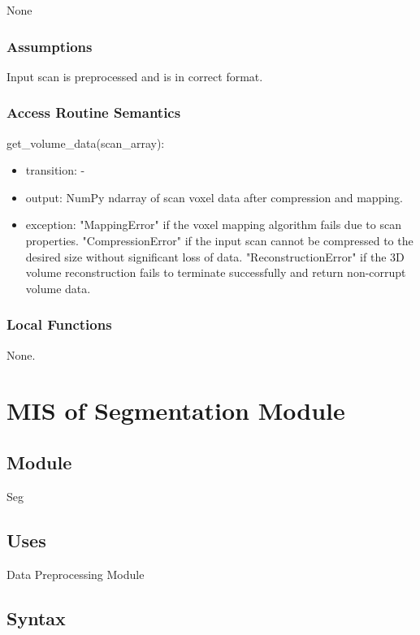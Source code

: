 \documentclass[12pt, titlepage]{article}
\begin{document}
None
\subsubsection{Assumptions}

Input scan is preprocessed and is in correct format.

\subsubsection{Access Routine Semantics}

\noindent get\_volume\_data(scan\_array):
\begin{itemize}
  \item transition: -
  \item output: NumPy ndarray of scan voxel data after compression and mapping.
  \item exception: "MappingError" if the voxel mapping algorithm fails due to scan properties.
        "CompressionError" if the input scan cannot be compressed to the desired size without significant loss of data.
        "ReconstructionError" if the 3D volume reconstruction fails to terminate successfully and return non-corrupt volume data.
\end{itemize}


\subsubsection{Local Functions}

None.


\newpage
\section{MIS of Segmentation Module} \label{Seg}

\subsection{Module}

Seg

\subsection{Uses}
Data Preprocessing Module

\subsection{Syntax}
\end{document}
